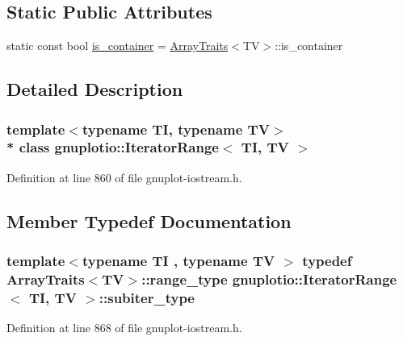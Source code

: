 \subsection*{Static Public Attributes}
\begin{DoxyCompactItemize}
\item 
static const bool \hyperlink{classgnuplotio_1_1_iterator_range_a3f79d84bdf18761b6e49ae54d050f8ff}{is\+\_\+container} = \hyperlink{classgnuplotio_1_1_array_traits}{Array\+Traits}$<$TV$>$\+::is\+\_\+container
\end{DoxyCompactItemize}


\subsection{Detailed Description}
\subsubsection*{template$<$typename TI, typename TV$>$\\*
class gnuplotio\+::\+Iterator\+Range$<$ T\+I, T\+V $>$}



Definition at line 860 of file gnuplot-\/iostream.\+h.



\subsection{Member Typedef Documentation}
\subsubsection[{\texorpdfstring{subiter\+\_\+type}{subiter_type}}]{\setlength{\rightskip}{0pt plus 5cm}template$<$typename TI , typename TV $>$ typedef {\bf Array\+Traits}$<$TV$>$\+::range\+\_\+type {\bf gnuplotio\+::\+Iterator\+Range}$<$ TI, TV $>$\+::{\bf subiter\+\_\+type}}\hypertarget{classgnuplotio_1_1_iterator_range_a566ca30462a029f6df4ef16116f99acd}{}\label{classgnuplotio_1_1_iterator_range_a566ca30462a029f6df4ef16116f99acd}


Definition at line 868 of file gnuplot-\/iostream.\+h.

